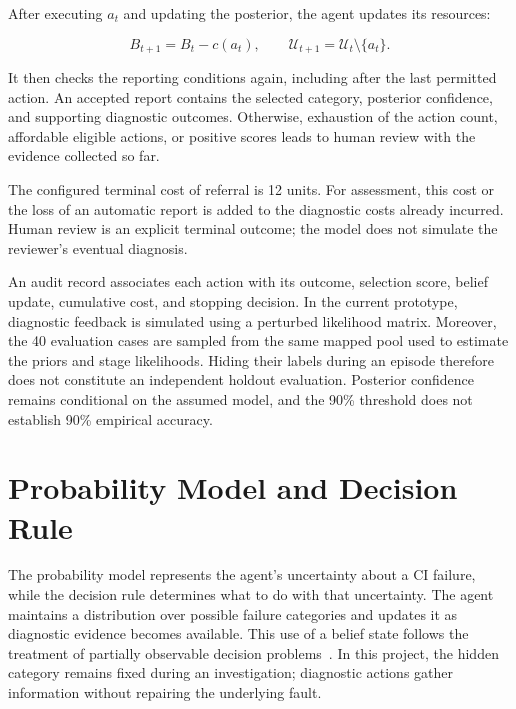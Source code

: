 \documentclass{article}
\begin{document}
After executing $a_t$ and updating the posterior, the agent updates its
resources:

\begin{equation}
B_{t+1}=B_t-c(a_t),
\qquad
\mathcal{U}_{t+1}=\mathcal{U}_t\setminus\{a_t\}.
\label{eq:agent_resource_update}
\end{equation}

It then checks the reporting conditions again, including after the last
permitted action. An accepted report contains the selected category,
posterior confidence, and supporting diagnostic outcomes. Otherwise,
exhaustion of the action count, affordable eligible actions, or positive
scores leads to human review with the evidence collected so far.

The configured terminal cost of referral is 12 units. For assessment, this
cost or the loss of an automatic report is added to the diagnostic costs
already incurred. Human review is an explicit terminal outcome; the model
does not simulate the reviewer's eventual diagnosis.

An audit record associates each action with its outcome, selection score,
belief update, cumulative cost, and stopping decision. In the current
prototype, diagnostic feedback is simulated using a perturbed likelihood
matrix. Moreover, the 40 evaluation cases are sampled from the same mapped
pool used to estimate the priors and stage likelihoods. Hiding their labels
during an episode therefore does not constitute an independent holdout
evaluation. Posterior confidence remains conditional on the assumed model,
and the 90\% threshold does not establish 90\% empirical accuracy.



\section{Probability Model and Decision Rule}
\label{sec:probability_model_decision_rule}

The probability model represents the agent's uncertainty about a CI
failure, while the decision rule determines what to do with that uncertainty.
The agent maintains a distribution over possible failure categories and
updates it as diagnostic evidence becomes available. This use of a belief
state follows the treatment of partially observable decision
problems~\cite{Kaelbling1998POMDP}. In this project, the hidden category remains fixed
during an investigation; diagnostic actions gather information without
repairing the underlying fault.
\end{document}
